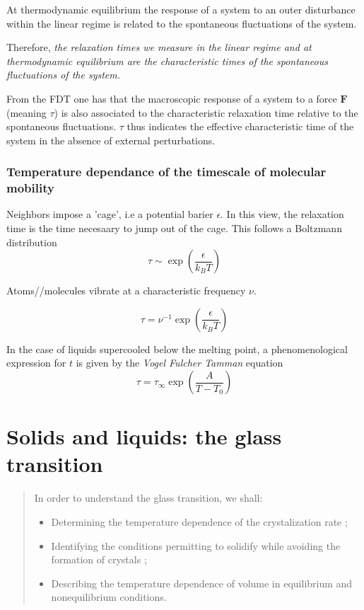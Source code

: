 \documentclass[../phys-f308.tex]{subfiles}
\begin{document}
    \begin{theorem}[FDT]
        At thermodynamic equilibrium the response of a system to an outer disturbance within the linear regime is related to the spontaneous fluctuations of the system.
    \end{theorem}

    Therefore, \emph{the relaxation times we measure in the linear regime and at thermodynamic equilibrium are the characteristic times of the spontaneous fluctuations of the system.}

    From the FDT one has that the macroscopic response of a system to a force $\bm{F}$ (meaning $\tau$) is also associated to the characteristic relaxation time relative to the spontaneous fluctuations. $\tau$ thus indicates the effective characteristic time of the system in the absence of external perturbations.\\

    \section{Temperature dependance of the timescale of molecular mobility}

    Neighbors impose a 'cage', i.e a potential barier $\epsilon$. In this view, the relaxation time is the time necesaary to jump out of the cage. This follows a Boltzmann distribution
    \begin{equation}
        \tau\sim\exp\left(\frac{\epsilon}{k_BT}\right)
    \end{equation}

    Atoms//molecules vibrate at a characteristic frequency $\nu$.

    \begin{equation}
        \tau = \nu^{-1}\exp\left(\frac{\epsilon}{k_BT}\right)
    \end{equation}

    In the case of liquids supercooled below the melting point, a phenomenological expression for $t$ is given by the \emph{Vogel Fulcher Tamman} equation
    \begin{equation}
        \tau = \tau_\infty\exp\left(\frac{A}{T-T_0}\right)
    \end{equation}

    \part{Solids and liquids: the glass transition}

    \begin{abstract}
        In order to understand the glass transition, we shall:
        \begin{itemize}
            \item Determining the temperature dependence of the crystalization rate ;
            \item Identifying the conditions permitting to solidify while avoiding the formation of crystals ;
            \item Describing the temperature dependence of volume in equilibrium and nonequilibrium conditions.
        \end{itemize}
    \end{abstract}
\end{document}
